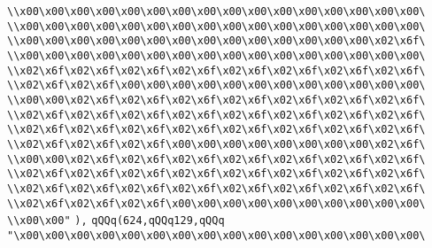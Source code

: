 \verb|\\x00\x00\x00\x00\x00\x00\x00\x00\x00\x00\x00\x00\x00\x00\x00\x00\|\newline
\verb|\\x00\x00\x00\x00\x00\x00\x00\x00\x00\x00\x00\x00\x00\x00\x00\x00\|\newline
\verb|\\x00\x00\x00\x00\x00\x00\x00\x00\x00\x00\x00\x00\x00\x00\x02\x6f\|\newline
\verb|\\x00\x00\x00\x00\x00\x00\x00\x00\x00\x00\x00\x00\x00\x00\x00\x00\|\newline
\verb|\\x02\x6f\x02\x6f\x02\x6f\x02\x6f\x02\x6f\x02\x6f\x02\x6f\x02\x6f\|\newline
\verb|\\x02\x6f\x02\x6f\x00\x00\x00\x00\x00\x00\x00\x00\x00\x00\x00\x00\|\newline
\verb|\\x00\x00\x02\x6f\x02\x6f\x02\x6f\x02\x6f\x02\x6f\x02\x6f\x02\x6f\|\newline
\verb|\\x02\x6f\x02\x6f\x02\x6f\x02\x6f\x02\x6f\x02\x6f\x02\x6f\x02\x6f\|\newline
\verb|\\x02\x6f\x02\x6f\x02\x6f\x02\x6f\x02\x6f\x02\x6f\x02\x6f\x02\x6f\|\newline
\verb|\\x02\x6f\x02\x6f\x02\x6f\x00\x00\x00\x00\x00\x00\x00\x00\x02\x6f\|\newline
\verb|\\x00\x00\x02\x6f\x02\x6f\x02\x6f\x02\x6f\x02\x6f\x02\x6f\x02\x6f\|\newline
\verb|\\x02\x6f\x02\x6f\x02\x6f\x02\x6f\x02\x6f\x02\x6f\x02\x6f\x02\x6f\|\newline
\verb|\\x02\x6f\x02\x6f\x02\x6f\x02\x6f\x02\x6f\x02\x6f\x02\x6f\x02\x6f\|\newline
\verb|\\x02\x6f\x02\x6f\x02\x6f\x00\x00\x00\x00\x00\x00\x00\x00\x00\x00\|\newline
\verb|\\x00\x00"|\newline
\verb|),|\newline
\verb|qQQq(624,qQQq129,qQQq|\newline
\verb|"\x00\x00\x00\x00\x00\x00\x00\x00\x00\x00\x00\x00\x00\x00\x00\x00\|\newline
